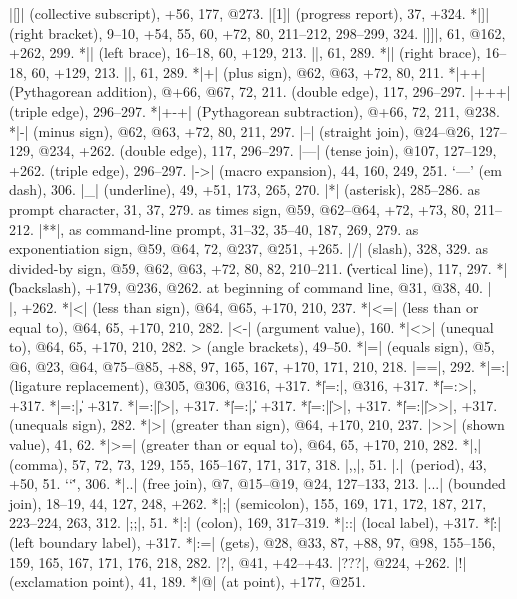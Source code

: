 |[]| (collective subscript), +56, 177, @273.
|[1]| (progress report), 37, +324.
*|]| (right bracket), 9--10, +54, 55, 60, +72, 80, 211--212, 298--299, 324.
|]]|, 61, @162, +262, 299.
*|{| (left brace), 16--18, 60, +129, 213.
|{{|, 61, 289.
*|}| (right brace), 16--18, 60, +129, 213.
|}}|, 61, 289.
*|+| (plus sign), @62, @63, +72, 80, 211.
*|++| (Pythagorean addition), @+66, @67, 72, 211.
\sub (double edge), 117, 296--297.
|+++| (triple edge), 296--297.
*|+-+| (Pythagorean subtraction), @+66, 72, 211, @238.
*|-| (minus sign), @62, @63, +72, 80, 211, 297.
|--| (straight join), @24--@26, 127--129, @234, +262.
\sub (double edge), 117, 296--297.
|---| (tense join), @107, 127--129, +262.
\sub (triple edge), 296--297.
|->| (macro expansion), 44, 160, 249, 251.
`---' (em dash), 306.
|_| (underline), 49, +51, 173, 265, 270.
|*| (asterisk), 285--286.
\sub as prompt character, 31, 37, 279.
\sub {}as times sign, @59, @62--@64, +72, +73, 80, 211--212.
|**|, as command-line prompt, 31--32, 35--40, 187, 269, 279.
\sub as exponentiation sign, @59, @64, 72, @237, @251, +265.
|/| (slash), 328, 329.
\sub {}as divided-by sign, @59, @62, @63, +72, 80, 82, 210--211.
\| (vertical line), 117, 297.
*|\| (backslash), +179, @236, @262.
\sub at beginning of command line, @31, @38, 40.
|\\|, +262.
*|<| (less than sign), @64, @65, +170, 210, 237.
*|<=| (less than or equal to), @64, 65, +170, 210, 282.
|<-| (argument value), 160.
*|<>| (unequal to),  @64, 65, +170, 210, 282.
\<> (angle brackets), 49--50.
*|=| (equals sign), @5, @6, @23, @64, @75--@85, +88, 97, 165, 167, +170,
 171, 210, 218.
|==|, 292.
*|=:| (ligature replacement), @305, @306, @316, +317.
*\||=:|, @316, +317.
*\||=:>|, +317.
*|=:|\|, +317.
*|=:|\||>|, +317.
*\||=:|\|, +317.
*\||=:|\||>|, +317.
*\||=:|\||>>|, +317.
\leavevmode{\tt \rlap/=} (unequals sign), 282.
*|>| (greater than sign), @64, +170, 210, 237.
|>>| (shown value), 41, 62.
*|>=| (greater than or equal to), @64, 65, +170, 210, 282.
*|,| (comma), 57, 72, 73, 129, 155, 165--167, 171, 317, 318.
|,,|\thinspace, 51.
|.|~(period), 43, +50, 51.
`\char`\.', 306.
*|..| (free join), @7, @15--@19, @24, 127--133, 213.
|...| (bounded join), 18--19, 44, 127, 248, +262.
*|;| (semicolon), 155, 169, 171, 172, 187, 217, 223--224, 263, 312.
|;;|\thinspace, 51.
*|:| (colon), 169, 317--319.
*|::| (local label), +317.
*\|\||:| (left boundary label), +317.
*|:=| (gets), @28, @33, 87, +88, 97, @98, 155--156, 159, 165, 167, 171,
 176, 218, 282.
|?|, @41, +42--+43.
|???|, @224, +262.
|!| (exclamation point), 41, 189.
*|@| (at point), +177, @251.
